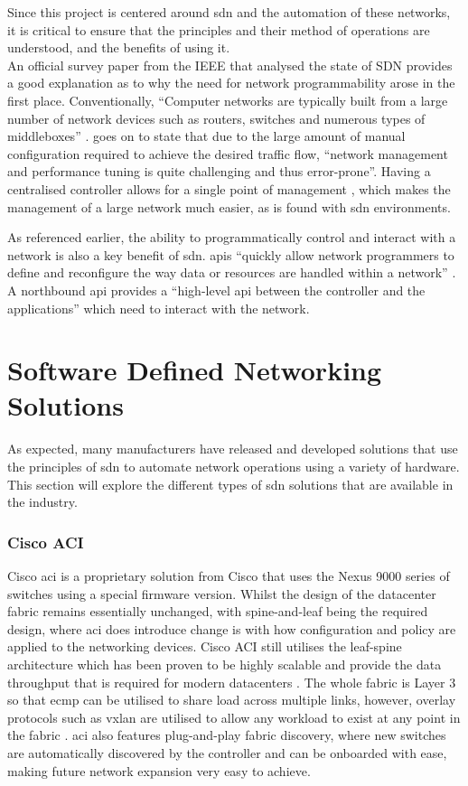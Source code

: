 Since this project is centered around \gls{sdn} and
the
automation of these networks, it is critical to ensure that the principles
and
their method of operations are understood, and the benefits of using it.\\
An official survey paper from the IEEE that analysed the state of SDN provides
a good explanation as to why the need for network programmability arose in the
first place. Conventionally, ``Computer networks are typically built from a
large number of network devices such as routers, switches and numerous types of
middleboxes'' \citep{1}. \citeauthor{1} goes on to state that due to the large
amount of manual configuration required to achieve the desired traffic flow,
“network management and performance tuning is quite challenging and thus
error-prone”.  Having a centralised controller allows for a single point of management \citep{7785187}, which makes the management of a large network much easier, as is found with \gls{sdn} environments.

As referenced earlier, the ability to programmatically control and interact with a network is also a key benefit of \gls{sdn}. \gls{api}s ``quickly allow network programmers to define and reconfigure the way data or resources are handled within a network'' \citep{9}. A northbound \gls{api} provides a ``high-level \gls{api} between the controller and the applications'' \citep{6844664} which need to interact with the network.
\section{Software Defined Networking Solutions}
\label{litreview:types}
As expected, many manufacturers have released and
developed solutions that use the principles of \gls{sdn} to automate network
operations using a variety of hardware. This section will explore the different
types of \gls{sdn} solutions that are available in the industry.

\subsubsection{Cisco ACI}
Cisco \gls{aci} is a proprietary solution from Cisco
that uses the Nexus 9000 series of switches using a special firmware version.
Whilst the design of the datacenter fabric remains essentially unchanged, with
spine-and-leaf being the required design, where \gls{aci} does introduce change
is with how configuration and policy are applied to the networking devices.
Cisco ACI still utilises the leaf-spine architecture which has been proven to
be highly scalable and provide the data throughput that is required for modern
datacenters \citep{7}. The whole fabric is Layer 3 so that \gls{ecmp} can be utilised to
share load across multiple links, however, overlay protocols such as
\gls{vxlan} are utilised to allow any workload to exist at any point in the
fabric \citep{duffy2014cisco}.
\gls{aci} also features plug-and-play fabric
discovery, where new switches are automatically discovered by the controller
and can be onboarded with ease, making future network expansion very easy to
achieve.

